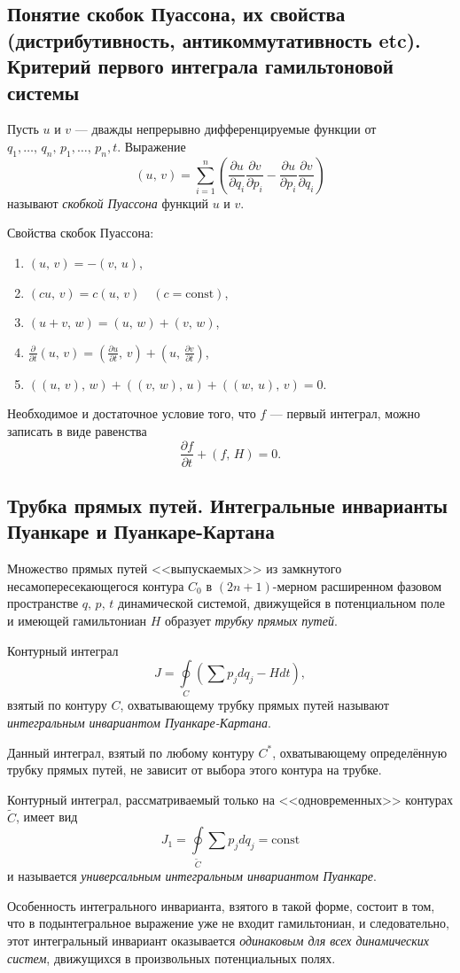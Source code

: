 \documentclass[a4paper]{article}
\begin{document}
\subsection{Понятие скобок Пуассона, их свойства (дистрибутивность,
антикоммутативность etc). Критерий первого интеграла гамильтоновой
системы}
\begin{dfn}
	Пусть $u$ и $v$ --- дважды непрерывно дифференцируемые функции от
	$q_1,\ldots,\,q_n,\,p_1,\ldots,\,p_n,t$. Выражение
	\[
		(u,\,v)= \sum_{i=1}^{n}\left( \frac{\partial u}{\partial q_i}
		\frac{\partial v}{\partial p_i} -\frac{\partial u}{\partial p_i} 
	\frac{\partial v}{\partial q_i} \right)
	\] 
	называют \emph{скобкой Пуассона} функций $u$ и $v$.
\end{dfn}
Свойства скобок Пуассона:
\begin{enumerate}
	\item $(u,\,v)=-(v,\,u)$,
	\item $(cu,\,v)=c(u,\,v) \quad (c=\mathrm{const})$,
	\item $(u+v,\,w)=(u,\,w)+(v,\,w)$,
	\item $\displaystyle \frac{\partial }{\partial t} (u,\,v)=
		\left( \frac{\partial u}{\partial t} ,\,v \right) +
		\left(u,\,\frac{\partial v}{\partial t}\right) $,
	\item $((u,\,v),\,w)+((v,\,w),\,u)+((w,\,u),\,v)=0$.
\end{enumerate}
Необходимое и достаточное  условие того, что $f$ --- первый интеграл, можно
записать в виде равенства
\[
	\frac{\partial f}{\partial t} +(f,\,H)=0
.\] 
\subsection{Трубка прямых путей. Интегральные инварианты Пуанкаре и
Пуанкаре-Картана}
\begin{dfn}
	Множество прямых путей <<выпускаемых>> из замкнутого
	несамопересекающегося контура $C_0$ в $(2n+1)$-мерном расширенном
	фазовом пространстве $q,\,p,\,t$ динамической системой, движущейся
	в потенциальном поле и имеющей гамильтониан $H$ образует \emph{трубку
	прямых путей}.
\end{dfn}
\begin{dfn}
	Контурный интеграл
	\[
		J = \oint\limits_C \left(\sum p_j dq_j - Hdt\right),
	\] 
	 взятый по контуру $C$, охватывающему трубку прямых путей называют
	 \emph{интегральным инвариантом Пуанкаре-Картана}.
\end{dfn}
Данный интеграл, взятый по любому контуру $C^*$, охватывающему определённую
трубку прямых путей, не зависит от выбора этого контура на трубке.
\begin{dfn}
	Контурный интеграл, рассматриваемый только на <<одновременных>>
	контурах $\tilde{C}$, имеет  вид
	\[
		J_1 = \oint\limits_{\tilde{C}} \sum p_j dq_j=\mathrm{const}
	\]
	и называется \emph{универсальным интегральным инвариантом Пуанкаре}.
\end{dfn}
Особенность интегрального инварианта, взятого в такой форме, состоит в том, что
в подынтегральное выражение уже не входит гамильтониан, и следовательно, этот
интегральный инвариант оказывается \emph{одинаковым для всех динамических
систем}, движущихся в произвольных потенциальных полях.
\end{document}

